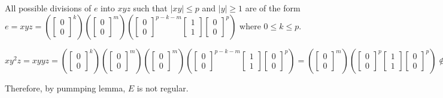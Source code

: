 \begin{enumerate}
          All possible divisions of $e$ into $xyz$ such that $\left|xy\right| \le p$ and $\left|y\right| \ge 1$ are of the form $e = xyz = \left(\begin{bmatrix}0 \\0\end{bmatrix}^k\right) \left(\begin{bmatrix}0 \\0\end{bmatrix}^m\right)\left(\begin{bmatrix}0 \\0\end{bmatrix}^{p-k-m} \begin{bmatrix}1 \\1\end{bmatrix} \begin{bmatrix}0 \\0\end{bmatrix}^{p}\right)$ where $0 \le k \le p$.

          $xy^2z = xyyz = \left(\begin{bmatrix}0 \\0\end{bmatrix}^k\right) \left(\begin{bmatrix}0 \\0\end{bmatrix}^m\right)\left(\begin{bmatrix}0 \\0\end{bmatrix}^m\right)\left(\begin{bmatrix}0 \\0\end{bmatrix}^{p-k-m} \begin{bmatrix}1 \\1\end{bmatrix} \begin{bmatrix}0 \\0\end{bmatrix}^{p}\right) =
              \left(\begin{bmatrix}0 \\0\end{bmatrix}^m\right)\left(\begin{bmatrix}0 \\0\end{bmatrix}^{p} \begin{bmatrix}1 \\1\end{bmatrix} \begin{bmatrix}0 \\0\end{bmatrix}^{p}\right) \notin E$

          Therefore, by pummping lemma, $E$ is not regular.
\end{enumerate}

